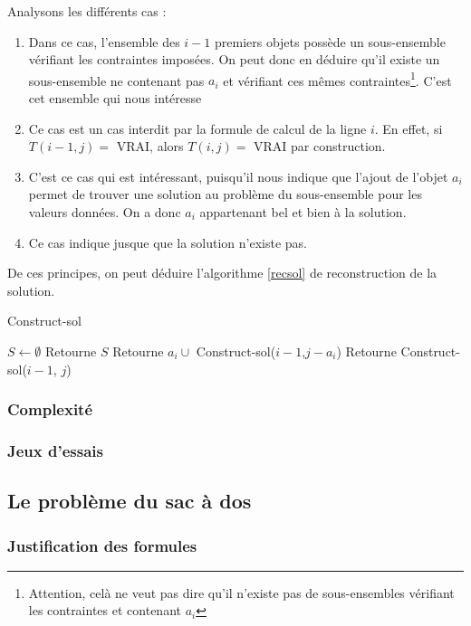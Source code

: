 Analysons les différents cas : \begin{enumerate}
	\item Dans ce cas, l'ensemble des $i-1$ premiers objets possède un sous-ensemble vérifiant les
		contraintes imposées. On peut donc en déduire qu'il existe un sous-ensemble ne contenant pas
		$a_i$ et vérifiant ces mêmes contraintes\footnote{Attention, celà ne veut pas dire qu'il
		n'existe pas de sous-ensembles vérifiant les contraintes et contenant $a_i$}. C'est cet ensemble
		qui nous intéresse
	\item Ce cas est un cas interdit par la formule de calcul de la ligne $i$. En effet, si $T(i-1, j)
		=$ VRAI, alors $T(i,j) =$ VRAI par construction.
	\item C'est ce cas qui est intéressant, puisqu'il nous indique que l'ajout de l'objet $a_i$ permet
		de trouver une solution au problème du sous-ensemble pour les valeurs données. On a donc $a_i$
		appartenant bel et bien à la solution.
	\item Ce cas indique jusque que la solution n'existe pas.
\end{enumerate}

De ces principes, on peut déduire l'algorithme \ref{recsol} de reconstruction de la solution.
\begin{algorithm}
	\caption{Construct-sol}
	\label{recsol}
	\begin{algorithmic}[1]
		\STATE $S \leftarrow \emptyset$
			\STATE Retourne $S$
		\ELSE
				\STATE Retourne $a_i \cup$ Construct-sol($i-1$,$j-a_i$)
			\ELSE
				\STATE Retourne Construct-sol($i-1$, $j$)
			\ENDIF
		\ENDIF
	\end{algorithmic}
\end{algorithm}


\subsubsection{Complexité}

\subsubsection{Jeux d'essais}


\subsection{Le problème du sac à dos}
\subsubsection{Justification des formules}

